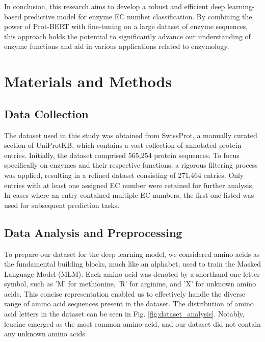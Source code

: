 \documentclass[conference]{IEEEtran}
\begin{document}
In conclusion, this research aims to develop a robust and efficient deep learning-based predictive model for enzyme EC number classification. By combining the power of Prot-BERT with fine-tuning on a large dataset of enzyme sequences, this approach holds the potential to significantly advance our understanding of enzyme functions and aid in various applications related to enzymology.

\newpage


\section{Materials and Methods}\label{sec11}

\subsection{Data Collection}

The dataset used in this study was obtained from SwissProt, a manually curated section of UniProtKB, which contains a vast collection of annotated protein entries. Initially, the dataset comprised 565,254 protein sequences. To focus specifically on enzymes and their respective functions, a rigorous filtering process was applied, resulting in a refined dataset consisting of 271,464 entries. Only entries with at least one assigned EC number were retained for further analysis. In cases where an entry contained multiple EC numbers, the first one listed was used for subsequent prediction tasks.



\subsection{Data Analysis and Preprocessing}



To prepare our dataset for the deep learning model, we considered amino acids as the fundamental building blocks, much like an alphabet, used to train the Masked Language Model (MLM). Each amino acid was denoted by a shorthand one-letter symbol, such as 'M' for methionine, 'R' for arginine, and 'X' for unknown amino acids. This concise representation enabled us to effectively handle the diverse range of amino acid sequences present in the dataset. The distribution of amino acid letters in the dataset can be seen in Fig. \ref{fig:dataset_analysis}. Notably, leucine emerged as the most common amino acid, and our dataset did not contain any unknown amino acids.
\end{document}
